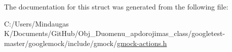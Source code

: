 The documentation for this struct was generated from the following file\+:\begin{DoxyCompactItemize}
\item 
C\+:/\+Users/\+Mindaugas K/\+Documents/\+Git\+Hub/\+Obj\+\_\+\+Duomenu\+\_\+apdorojimas\+\_\+class/googletest-\/master/googlemock/include/gmock/\mbox{\hyperlink{googletest-master_2googlemock_2include_2gmock_2gmock-actions_8h}{gmock-\/actions.\+h}}\end{DoxyCompactItemize}
